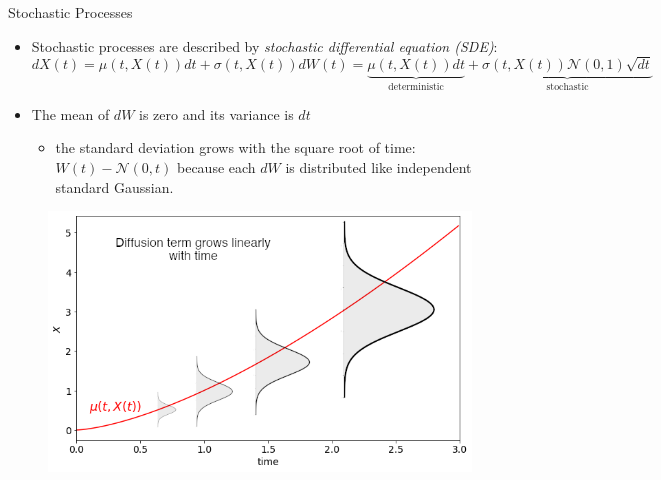 \documentclass{beamer}
\begin{document}
\begin{frame}{Stochastic Processes}
\begin{itemize}
\item Stochastic processes are described by \emph{stochastic differential equation (SDE)}:
\begin{equation*}
dX(t) = \mu(t,X(t)) dt + \sigma(t,X(t)) dW(t) = \underbrace{\mu(t,X(t))dt}_{\textrm{deterministic}} + \underbrace{\sigma(t,X(t)) \mathcal{N}(0,1)\sqrt{dt}}_{\textrm{stochastic}}
\end{equation*}
\item The mean of $dW$ is zero and its variance is $dt$
   \begin{itemize}
    \item the standard deviation grows with the square root of time: $W(t) - \mathcal{N}( 0, t )$ because each $dW$ is distributed like independent standard Gaussian.
    \end{itemize}
\end{itemize}
\begin{figure}[h]
    \begin{center}
    \includegraphics[width=0.50\linewidth]{brownian_process}
    \end{center}
\end{figure}        
\end{frame}
\end{document}
